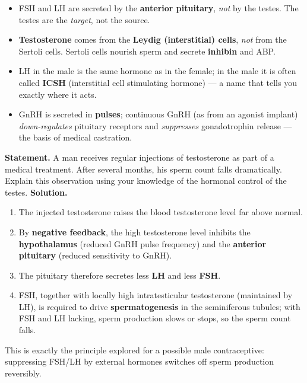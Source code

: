 \documentclass[11pt]{article}
\begin{document}
\begin{attention}
\begin{itemize}
\item FSH and LH are secreted by the \textbf{anterior pituitary}, \emph{not} by the testes. The testes are the \emph{target}, not the source.
\item \textbf{Testosterone} comes from the \textbf{Leydig (interstitial) cells}, \emph{not} from the Sertoli cells. Sertoli cells nourish sperm and secrete \textbf{inhibin} and ABP.
\item LH in the male is the same hormone as in the female; in the male it is often called \textbf{ICSH} (interstitial cell stimulating hormone) — a name that tells you exactly where it acts.
\item GnRH is secreted in \textbf{pulses}; continuous GnRH (as from an agonist implant) \emph{down-regulates} pituitary receptors and \emph{suppresses} gonadotrophin release — the basis of medical castration.
\end{itemize}
\end{attention}

\begin{exoresolu}
\textbf{Statement.} A man receives regular injections of testosterone as part of a medical treatment. After several months, his sperm count falls dramatically. Explain this observation using your knowledge of the hormonal control of the testes.
\tcblower
\textbf{Solution.}
\begin{enumerate}
\item The injected testosterone raises the blood testosterone level far above normal.
\item By \textbf{negative feedback}, the high testosterone level inhibits the \textbf{hypothalamus} (reduced GnRH pulse frequency) and the \textbf{anterior pituitary} (reduced sensitivity to GnRH).
\item The pituitary therefore secretes less \textbf{LH} and less \textbf{FSH}.
\item FSH, together with locally high intratesticular testosterone (maintained by LH), is required to drive \textbf{spermatogenesis} in the seminiferous tubules; with FSH and LH lacking, sperm production slows or stops, so the sperm count falls.
\end{enumerate}
This is exactly the principle explored for a possible male contraceptive: suppressing FSH/LH by external hormones switches off sperm production reversibly.
\end{exoresolu}
\end{document}
